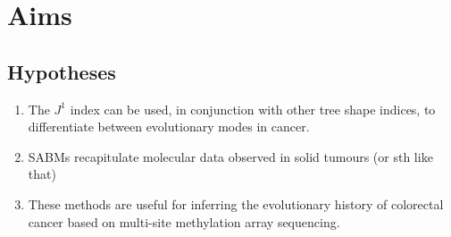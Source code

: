\section{Aims}

\subsection{Hypotheses}
\begin{enumerate}
    \item The $J^1$ index can be used, in conjunction with other
        tree shape indices, to differentiate between evolutionary modes in cancer.
    \item SABMs recapitulate molecular data observed in solid tumours (or sth like that)
    \item These methods are useful for inferring the evolutionary history of colorectal cancer based on multi-site
        methylation array sequencing.
\end{enumerate}


